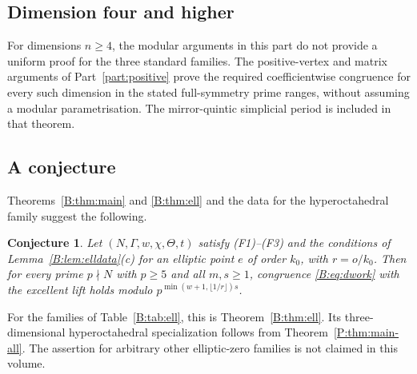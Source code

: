 \documentclass[11pt,a4paper]{article}
\newtheorem{conjecture}[theorem]{Conjecture}
\theoremstyle{definition}\newtheorem{definition}[theorem]{Definition}
\theoremstyle{remark}\newtheorem{remark}[theorem]{Remark}
\numberwithin{equation}{section}
\begin{document}
\subsection{Dimension four and higher}
For dimensions $n\ge4$, the modular arguments in this part do not provide a uniform proof for the three standard families. The positive-vertex and matrix arguments of Part~\ref{part:positive} prove the required coefficientwise congruence for every such dimension in the stated full-symmetry prime ranges, without assuming a modular parametrisation. The mirror-quintic simplicial period is included in that theorem.

\subsection{A conjecture}
Theorems~\ref{B:thm:main} and \ref{B:thm:ell} and the data for the hyperoctahedral family suggest the following.

\begin{conjecture}\label{B:conj:ell}
Let $(N,\Gamma,w,\chi,\Theta,t)$ satisfy \textup{(F1)--(F3)} and the conditions of Lemma~\ref{B:lem:elldata}\textup{(c)} for an
elliptic point $e$ of order $k_0$, with $r=o/k_0$. Then for every prime $p\nmid N$ with $p\ge5$ and all $m,s\ge1$,
congruence \eqref{B:eq:dwork} with the excellent lift holds modulo $p^{\min(w+1,\lfloor1/r\rfloor)s}$.
\end{conjecture}

For the families of Table~\ref{B:tab:ell}, this is Theorem~\ref{B:thm:ell}. Its three-dimensional hyperoctahedral specialization follows from Theorem~\ref{P:thm:main-all}. The assertion for arbitrary other elliptic-zero families is not claimed in this volume.
\end{document}
